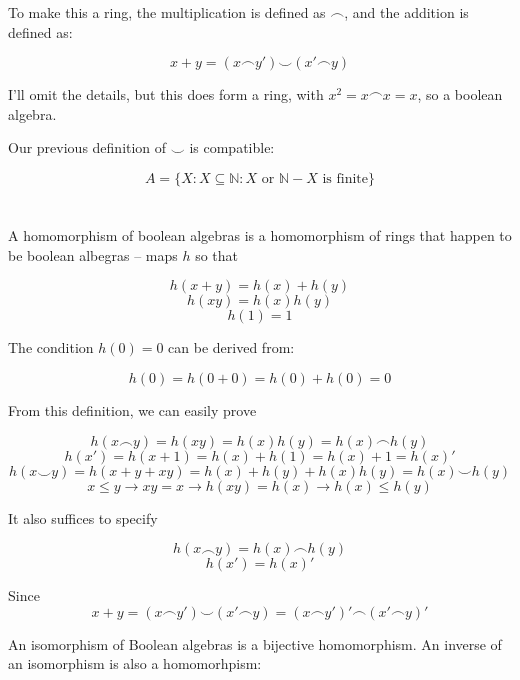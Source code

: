 \documentclass{article}
\begin{document}
    To make this a ring, the multiplication is defined as $\frown$, and the
    addition is defined as:

    \[ x + y = (x \frown y') \smile (x' \frown y)\]

    I'll omit the details, but this does form a ring, with $x^2 = x \frown x =
    x$, so a boolean algebra.

    Our previous definition of $\smile$ is compatible:


    \[A = \{X: X \subseteq \mathbb{N}: X \text{ or } \mathbb{N} - X \text{ is
    finite} \} \]

    \section{}

    A homomorphism of boolean algebras is a homomorphism of rings that happen to
    be boolean albegras -- maps $h$ so that

    \[h(x+y) = h(x) + h(y)\]
    \[h(xy) = h(x)h(y)\]
    \[h(1) = 1\]

    The condition $h(0)= 0$ can be derived from:

    \[h(0) = h(0+0) = h(0)+h(0) = 0\]

    From this definition, we can easily prove

    \[h(x \frown y) = h(xy) = h(x)h(y) = h(x) \frown h(y)\]
    \[h(x') = h(x+1) = h(x) + h(1) = h(x) + 1 = h(x)'\]
    \[h(x \smile y) = h(x + y + xy) = h(x) + h(y) + h(x)h(y) = h(x) \smile
    h(y)\]
    \[x \leq y \rightarrow xy = x \rightarrow h(xy) = h(x) \rightarrow h(x) \leq
    h(y)\]

    It also suffices to specify

    \[ h(x \frown y) = h(x) \frown h(y) \]
    \[h(x') = h(x)'\]

    Since
    \[x + y = (x \frown y') \smile (x' \frown y) = (x \frown y')' \frown (x'
    \frown y)'\]

    An isomorphism of Boolean algebras is a bijective homomorphism. An inverse
    of an isomorphism is also a homomorhpism:




    
\end{document}
